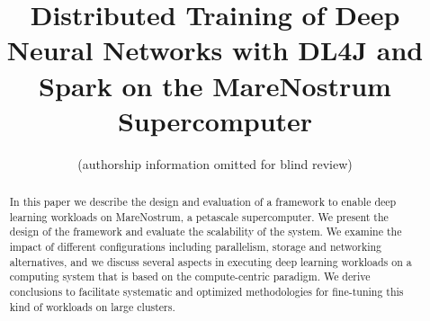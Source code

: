 \documentclass[journal]{IEEEtran}
\begin{document}
\title{Distributed Training of Deep Neural Networks with DL4J and Spark on the MareNostrum Supercomputer}

%

%                       

\author{
		(authorship information omitted for blind review)

                       
}


%


\maketitle\thispagestyle{empty}


\begin{abstract}
In this paper we describe the design and evaluation of a framework to enable deep learning workloads on MareNostrum, a petascale supercomputer. We present the design of the framework and evaluate the scalability of the system. We examine the impact of different configurations including parallelism, storage and networking alternatives, and we discuss several aspects in executing deep learning workloads on a computing system that is based on the compute-centric paradigm. We derive conclusions to facilitate systematic and optimized methodologies for fine-tuning this kind of workloads on large clusters. 
\end{abstract}
\end{document}
